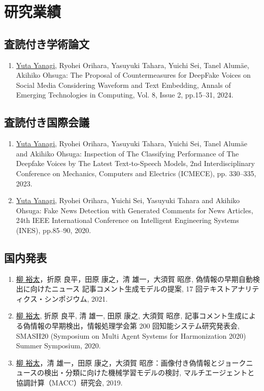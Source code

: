 \chapter*{研究業績}
\section{査読付き学術論文}
\begin{enumerate}
    \item \underline{Yuta Yanagi}, Ryohei Orihara, Yasuyuki Tahara, Yuichi Sei, Tanel Alumäe, Akihiko Ohsuga: The Proposal of Countermeasures for DeepFake Voices on Social Media Considering Waveform and Text Embedding, Annals of Emerging Technologies in Computing, Vol. 8, Issue 2, pp.15–31, 2024.
\end{enumerate}

\section{査読付き国際会議}
\begin{enumerate}
    \item \underline{Yuta Yanagi}, Ryohei Orihara, Yasuyuki Tahara, Yuichi Sei, Tanel Alumäe and Akihiko Ohsuga: Inspection of The Classifying Performance of The Deepfake Voices by The Latest Text-to-Speech Models, 2nd Interdisciplinary Conference on Mechanics, Computers and Electrics (ICMECE), pp. 330–335, 2023.
    \item \underline{Yuta Yanagi}, Ryohei Orihara, Yuichi Sei, Yasuyuki Tahara and Akihiko Ohsuga: Fake News Detection with Generated Comments for News Articles, 24th IEEE International Conference on Intelligent Engineering Systems (INES), pp.85–90, 2020.
\end{enumerate}

\section{国内発表}
\begin{enumerate}
    \item \underline{柳 裕太}，折原 良平，田原 康之，清 雄一，大須賀 昭彦, 偽情報の早期自動検出に向けたニュース 記事コメント生成モデルの提案, 17 回テキストアナリティクス・シンポジウム, 2021.
    \item \underline{柳 裕太}, 折原 良平, 清 雄一, 田原 康之, 大須賀 昭彦, 記事コメント生成による偽情報の早期検出，情報処理学会第 200 回知能システム研究発表会, SMASH20 (Symposium on Multi Agent Systems for Harmonization 2020) Summer Symposium, 2020.
    \item \underline{柳 裕太}，清 雄一，田原 康之，大須賀 昭彦：画像付き偽情報とジョークニュースの検出・分類に向けた機械学習モデルの検討, マルチエージェントと協調計算（MACC）研究会, 2019. 
\end{enumerate}
